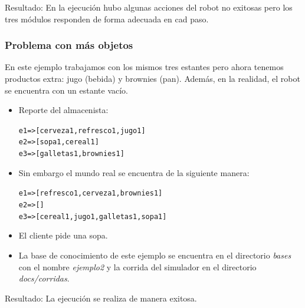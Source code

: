 \documentclass[11pt]{article}
\newcommand{\bt}{\begin{alltt}}
\newcommand{\et}{\end{alltt}}
\begin{document}
Resultado: En la ejecución hubo algunas acciones del robot no
exitosas pero los tres módulos responden de forma adecuada en
cad paso.

\subsubsection{Problema con más objetos}

En este ejemplo trabajamos con los mismos tres estantes pero
ahora tenemos productos extra: jugo (bebida) y brownies (pan).
Además, en la realidad, el robot se encuentra con un estante
vacío.

\begin{itemize}
\item Reporte del almacenista:
  \bt
  e1 => [cerveza1,refresco1,jugo1]
  e2 => [sopa1,cereal1]
  e3 => [galletas1,brownies1]
  \et
\item Sin embargo el mundo real se encuentra de la siguiente manera:
  \bt
  e1 => [refresco1,cerveza1,brownies1]
  e2 => []
  e3 => [cereal1,jugo1,galletas1,sopa1]
  \et
 \item El cliente pide una sopa.
\item La base de conocimiento de este ejemplo se encuentra
  en el directorio \emph{bases} con el nombre \emph{ejemplo2} y la
  corrida del simulador en el directorio \emph{docs/corridas}.
\end{itemize}

Resultado: La ejecución se realiza de manera exitosa.
\end{document}

